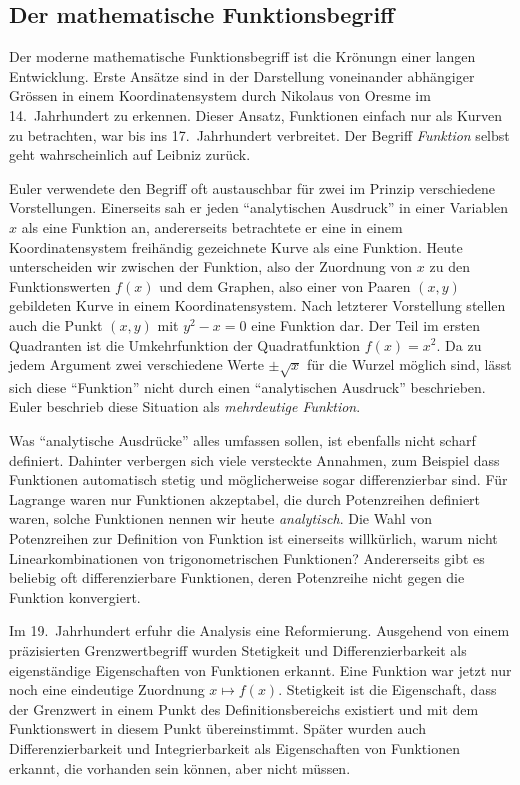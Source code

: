 %
%
\subsection*{Der mathematische Funktionsbegriff}
Der moderne mathematische Funktionsbegriff ist die Krönungn einer
langen Entwicklung.
Erste Ansätze sind in der Darstellung voneinander abhängiger Grössen
in einem Koordinatensystem durch Nikolaus von Oresme im 14.~Jahrhundert
zu erkennen.
Dieser Ansatz, Funktionen einfach nur als Kurven zu betrachten,
war bis ins 17.~Jahrhundert verbreitet.
Der Begriff {\em Funktion} selbst geht wahrscheinlich auf Leibniz
zurück.

Euler verwendete den Begriff oft austauschbar für zwei im Prinzip
verschiedene Vorstellungen.
Einerseits sah er jeden ``analytischen Ausdruck'' in einer Variablen
$x$ als eine Funktion an, andererseits betrachtete er eine in einem
Koordinatensystem freihändig gezeichnete Kurve als eine Funktion.
Heute unterscheiden wir zwischen der Funktion, also der Zuordnung
von $x$ zu den Funktionswerten $f(x)$ und dem Graphen, also einer
von Paaren $(x,y)$ gebildeten Kurve in einem Koordinatensystem.
Nach letzterer Vorstellung stellen auch die Punkt $(x,y)$ mit $y^2-x=0$
eine Funktion dar.
Der Teil im ersten Quadranten ist
die Umkehrfunktion der Quadratfunktion $f(x)=x^2$.
Da zu jedem Argument zwei verschiedene Werte $\pm\sqrt{x}$
für die Wurzel möglich sind, lässt sich diese ``Funktion'' nicht
durch einen ``analytischen Ausdruck'' beschrieben.
Euler beschrieb diese Situation als {\em mehrdeutige Funktion}.

Was ``analytische Ausdrücke'' alles umfassen sollen, ist ebenfalls
nicht scharf definiert.
Dahinter verbergen sich viele versteckte Annahmen, zum Beispiel
dass Funktionen automatisch stetig und möglicherweise sogar
differenzierbar sind.
Für Lagrange waren nur Funktionen akzeptabel, die durch Potenzreihen
definiert waren, solche Funktionen nennen wir heute {\em analytisch}.
Die Wahl von Potenzreihen zur Definition von Funktion ist einerseits
willkürlich, warum nicht Linearkombinationen von trigonometrischen
Funktionen?
Andererseits gibt es beliebig oft differenzierbare Funktionen,
deren Potenzreihe nicht gegen die Funktion konvergiert.

Im 19.~Jahrhundert erfuhr die Analysis eine Reformierung.
Ausgehend von einem präzisierten Grenzwertbegriff wurden Stetigkeit
und Differenzierbarkeit als eigenständige Eigenschaften von
Funktionen erkannt.
Eine Funktion war jetzt nur noch eine eindeutige Zuordnung
$x\mapsto f(x)$.
Stetigkeit ist die Eigenschaft, dass der Grenzwert in einem
Punkt des Definitionsbereichs existiert und mit dem Funktionswert
in diesem Punkt übereinstimmt. 
Später wurden auch Differenzierbarkeit und Integrierbarkeit als
Eigenschaften von Funktionen erkannt, die vorhanden sein können,
aber nicht müssen.

